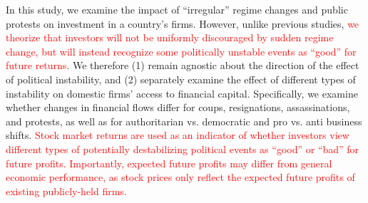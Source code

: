 \documentclass[12pt,final,fleqn]{article}
\theoremstyle{plain}
\begin{document}

In this study, we examine the impact of ``irregular'' regime changes and public protests on investment in a country's firms. However, unlike previous studies, \textcolor{red}{we theorize that investors will not be uniformly discouraged by sudden regime change, but will instead recognize some politically unstable events as ``good'' for future returns}. We therefore (1) remain agnostic about the direction of the effect of political instability, and (2) separately examine the effect of different types of instability on domestic firms' access to financial capital. Specifically, we examine whether changes in financial flows differ for coups, resignations, assassinations, and protests, as well as for authoritarian vs. democratic and pro vs. anti business shifts. \textcolor{red}{Stock market returns are used as an indicator of whether investors view different types of potentially destabilizing political events as ``good'' or ``bad'' for future profits. Importantly, expected future profits may differ from general economic performance, as stock prices only reflect the expected future profits of existing publicly-held firms.} 

\end{document}
